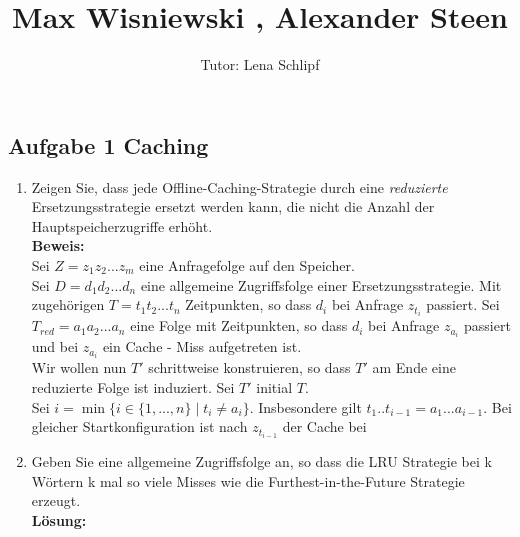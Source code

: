 \documentclass[11pt,a4paper,ngerman]{article}
\author{Tutor: Lena Schlipf}
\date{}
\title{Max Wisniewski , Alexander Steen}
\begin{document}

\maketitle
\thispagestyle{fancy}

\subsection*{Aufgabe 1 \mdseries Caching}

\begin{enumerate}[\bfseries (a)]

\item Zeigen Sie, dass jede Offline-Caching-Strategie durch eine \emph{reduzierte} Ersetzungsstrategie ersetzt werden kann, die nicht die Anzahl der Hauptspeicherzugriffe erhöht.\\

\textbf{Beweis:}\\

Sei $Z = z_1z_2 ... z_m$ eine Anfragefolge auf den Speicher.\\
Sei $D = d_1d_2 ... d_n$ eine allgemeine Zugriffsfolge einer Ersetzungsstrategie. Mit zugehörigen $T = t_1t_2 ... t_n$ Zeitpunkten, so dass $d_i$ bei Anfrage $z_{t_i}$ passiert. Sei $T_{red} = a_1a_2 ... a_n$ eine Folge mit Zeitpunkten, so dass $d_i$ bei Anfrage $z_{a_i}$ passiert und bei $z_{a_i}$ ein Cache - Miss aufgetreten ist.\\

Wir wollen nun $T' $ schrittweise konstruieren, so dass $T'$ am Ende eine reduzierte Folge ist induziert. Sei $T'$ initial $T$.\\

Sei $i = \min \{ i \in \{ 1, ... , n \} \; | \; t_i \not= a_i \}$. Insbesondere gilt $t_1 .. t_{i-1} = a_1 ... a_{i-1}$. Bei gleicher Startkonfiguration ist nach $z_{t_{i-1}}$ der Cache bei 

\item Geben Sie eine allgemeine Zugriffsfolge an, so dass die LRU Strategie bei k Wörtern k mal so viele Misses wie die Furthest-in-the-Future Strategie erzeugt.\\

\textbf{Lösung:}\\


\end{enumerate}
\end{document}

